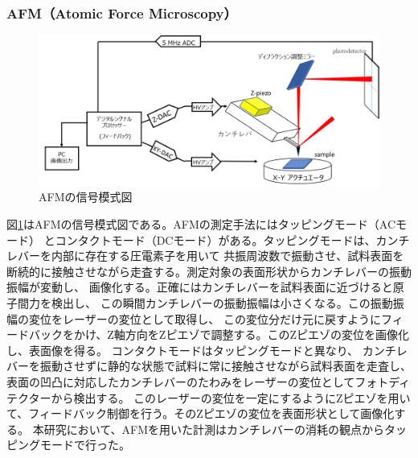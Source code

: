 \documentclass[dvipdfmx,12pt,a4paper]{jreport}
\begin{document}
				\subsubsection{AFM（Atomic Force Microscopy）}
				\begin{figure}[h]
					\centering
					\includegraphics[width=0.8\linewidth]{AFM.png}
					\caption{AFMの信号模式図}
					\label{stracture_of_AFM}
				\end{figure}
				図\ref{stracture_of_AFM}はAFMの信号模式図である。AFMの測定手法にはタッピングモード（ACモード）
				とコンタクトモード（DCモード）がある。タッピングモードは、カンチレバーを内部に存在する圧電素子を用いて
				共振周波数で振動させ、試料表面を断続的に接触させながら走査する。測定対象の表面形状からカンチレバーの振動振幅が変動し、
				画像化する。正確にはカンチレバーを試料表面に近づけると原子間力を検出し、
				この瞬間カンチレバーの振動振幅は小さくなる。この振動振幅の変位をレーザーの変位として取得し、
				この変位分だけ元に戻すようにフィードバックをかけ、Z軸方向をZピエゾで調整する。このZピエゾの変位を画像化し、表面像を得る。
				コンタクトモードはタッピングモードと異なり、
				カンチレバーを振動させずに静的な状態で試料に常に接触させながら試料表面を走査し、
				表面の凹凸に対応したカンチレバーのたわみをレーザーの変位としてフォトディテクターから検出する。
				このレーザーの変位を一定にするようにZピエゾを用いて、フィードバック制御を行う。そのZピエゾの変位を表面形状として画像化する。
				本研究において、AFMを用いた計測はカンチレバーの消耗の観点からタッピングモードで行った。
\end{document}
